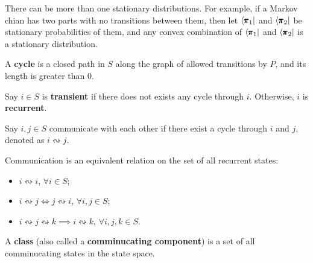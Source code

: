\begin{remark}
    There can be more than one stationary distributions. For example, if a Markov chian has two parts with no transitions between them, then let $\left<\pmb{\pi}_1\right|$ and $\left< \pmb{\pi}_2 \right|$ be stationary probabilities of them, and any convex combination of $\left<\pmb{\pi}_1\right|$ and $\left< \pmb{\pi}_2 \right|$ is a stationary distribution.
\end{remark}

\begin{definition}[Cycles]
    A \textbf{cycle} is a closed path in $S$ along the graph of allowed transitions by $P$, and its length is greater than $0$.
\end{definition}

\begin{definition}
    Say $i \in S$ is \textbf{transient} if there does not exists any cycle through $i$. Otherwise, $i$ is \textbf{recurrent}.
\end{definition}

\begin{definition}[Communication]
    Say $i,j \in S$ communicate with each other if there exist a cycle through $i$ and $j$, denoted as $i \leftrightsquigarrow j$.
\end{definition}

\begin{proposition}
    Communication is an equivalent relation on the set of all recurrent states:
    \begin{itemize}
        \item $i \leftrightsquigarrow i$, $\forall i \in S$;
        \item $i \leftrightsquigarrow j \iff j \leftrightsquigarrow i$, $\forall i,j \in S$;
        \item $i \leftrightsquigarrow j \leftrightsquigarrow k \implies i \leftrightsquigarrow k$, $\forall i,j,k \in S$.
    \end{itemize}
\end{proposition}

\begin{definition}
    A \textbf{class} (also called a \textbf{comminucating component}) is a set of all comminucating states in the state space.
\end{definition}